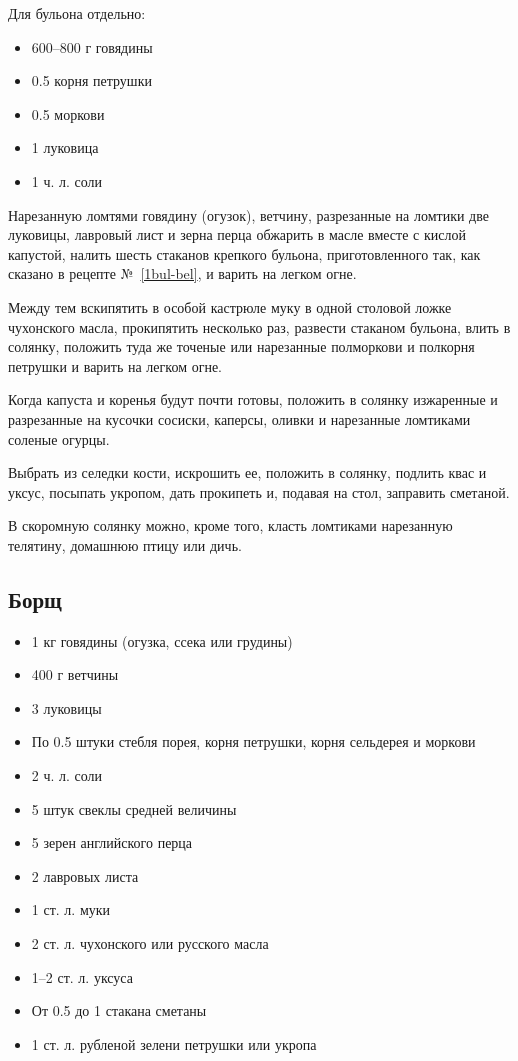 Для бульона отдельно: 
    
\begin{itemize}
	\item 600–800 г говядины 
	\item 0.5 корня петрушки 
	\item 0.5 моркови 
	\item 1 луковица 
	\item 1 ч. л. соли
\end{itemize}

Нарезанную ломтями говядину (огузок), ветчину, разрезанные на ломтики две луковицы, лавровый лист и зерна перца обжарить в масле вместе с кислой капустой, налить шесть стаканов крепкого бульона, приготовленного так, как сказано в рецепте №~\ref{1bul-bel}, и варить на легком огне.

Между тем вскипятить в особой кастрюле муку в одной столовой ложке чухонского масла, прокипятить несколько раз, развести стаканом бульона, влить в солянку, положить туда же точеные или нарезанные полморкови и полкорня петрушки и варить на легком огне.

Когда капуста и коренья будут почти готовы, положить в солянку изжаренные и разрезанные на кусочки сосиски, каперсы, оливки и нарезанные ломтиками соленые огурцы.

Выбрать из селедки кости, искрошить ее, положить в солянку, подлить квас и уксус, посыпать укропом, дать прокипеть и, подавая на стол, заправить сметаной.

В скоромную солянку можно, кроме того, класть ломтиками нарезанную телятину, домашнюю птицу или дичь.

\subsection{Борщ}\label{30borsch}

\begin{itemize}
	\item 1 кг говядины (огузка, ссека или грудины) 
	\item 400 г ветчины 
	\item 3 луковицы 
	\item По 0.5 штуки стебля порея, корня петрушки, корня сельдерея и моркови 
	\item 2 ч. л. соли 
	\item 5 штук свеклы средней величины 
	\item 5 зерен английского перца 
	\item 2 лавровых листа 
	\item 1 ст. л. муки 
	\item 2 ст. л. чухонского или русского масла 
	\item 1–2 ст. л. уксуса 
	\item От 0.5 до 1 стакана сметаны 
	\item 1 ст. л. рубленой зелени петрушки или укропа
\end{itemize}

